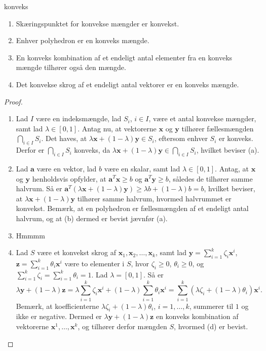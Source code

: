 %
%
\begin{thm}{}{konveks}
\begin{enumerate}[label=(\alph*)]
	\item Skæringspunktet for konvekse mængder er konvekst. 
	\item Enhver polyhedron er en konveks mængde.
	\item En konveks kombination af et endeligt antal elementer fra en konveks mængde tilhører også den mængde. 
	\item Det konvekse skrog af et endeligt antal vektorer er en konveks mængde. 
\end{enumerate}
\end{thm}
%
%
\begin{proof}
\begin{enumerate}[label=(\alph*)]
	\item Lad $I$ være en indeksmængde, lad $S_i$, $i \in I$, være et antal konvekse mængder, samt lad $ \lambda \in [0,1]$.
Antag nu, at vektorerne $\textbf{x}$ og $\textbf{y}$ tilhører fællesmængden $ \bigcap_{i \in I} S_i$. Det haves, at $ \lambda \textbf{x} + (1 - \lambda )\textbf{y} \in S_i$, eftersom enhver $S_i$ er konveks. Derfor er $ \bigcap_{i \in I} S_i$ konveks, da $ \lambda \textbf{x} + (1 - \lambda )\textbf{y} \in  \bigcap_{i \in I} S_i$, hvilket beviser (a). 
	\item Lad $\textbf{a}$ være en vektor, lad $b$ være en skalar, samt lad $ \lambda \in [0,1]$. 
Antag, at $\textbf{x}$ og $\textbf{y}$ henholdsvis opfylder, at $\textbf{a}^T \textbf{x} \geq b$ og $\textbf{a}^T \textbf{y} \geq b$, således de tilhører samme halvrum. 
Så er $\textbf{a}^T (\lambda \textbf{x} + (1 - \lambda) \textbf{y} ) \geq \lambda b + (1 - \lambda ) b = b$, hvilket beviser, at $ \lambda \textbf{x} + (1 - \lambda )\textbf{y}$ tilhører samme halvrum, hvormed halvrummet er konvekst.
Bemærk, at en polyhedron er fællesmængden af et endeligt antal halvrum, og at (b) dermed er bevist jævnfør (a). 
	\item Hmmmm
	\item Lad $S$ være et konvekst skrog af $\textbf{x}_1, \textbf{x}_2, \ldots, \textbf{x}_k$, samt lad $\textbf{y} = \sum_{i=1}^{k} \zeta_i \textbf{x}^i$, $\textbf{z} = \sum_{i=1}^{k} \theta_i \textbf{x}^i$ være to elementer i $S$, hvor $ \zeta_i \geq 0$, $ \theta_i \geq 0$, og $ \sum_{i=1}^{k} \zeta_i = \sum_{i=1}^{k} \theta_i = 1$. 
	Lad $ \lambda = [0,1]$. Så er $$\lambda \textbf{y} + (1 - \lambda ) \textbf{z} = \lambda \sum_{i=1}^k \zeta_i \textbf{x}^i + (1 - \lambda) \sum_{i=1}^k \theta_i \textbf{x}^i = \sum_{i=1}^k (\lambda \zeta_i + (1-\lambda )\theta_i ) \textbf{x}^i.$$
Bemærk, at koefficienterne $ \lambda \zeta_i + (1 - \lambda) \theta_i$, $i = 1, \ldots, k$, summerer til $1$ og ikke er negative. Dermed er $ \lambda \textbf{y} + (1 - \lambda ) \textbf{z}$ en konveks kombination af vektorerne $\textbf{x}^1, \ldots, \textbf{x}^k$, og tilhører derfor mængden $S$, hvormed (d) er bevist. 
\end{enumerate}
\end{proof}
